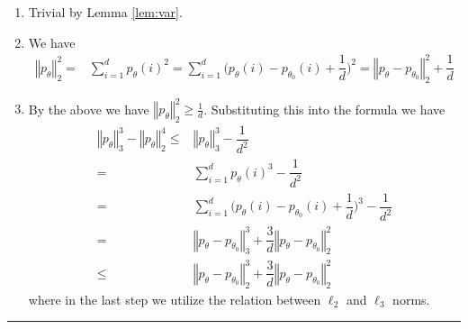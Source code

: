 \documentclass[twoside,12pt]{article}
\newenvironment{proof}{{\bf Proof:}}{\hfill\rule{2mm}{2mm}}
\begin{document}
\begin{proof}
\begin{enumerate}
   \item Trivial by Lemma \ref{lem:var}.
   \item We have
   \begin{align*}
      \left\Vert p_\theta  \right\Vert _2^2 = & \sum_{i=1}^d p_\theta (i)^2= \sum_{i=1}^d \big( p_\theta (i) -p_{\theta _0}(i) + \dfrac{ 1 }{ d } \big)^2= \left\Vert p_\theta -p_{\theta _0} \right\Vert _2^2 +\dfrac{ 1 }{ d }
   \end{align*}
   
   \item By the above we have $ \left\Vert p_\theta  \right\Vert _2^2 \geq \frac{1}{d} $. Substituting this into the formula we have
   \begin{align*}
      \left\Vert p_\theta  \right\Vert _3^3 - \left\Vert p_\theta \right\Vert _2^4 \leq & \left\Vert p_\theta  \right\Vert _3^3 - \dfrac{ 1 }{ d^2 }\\
      =&\sum_{i=1}^d p_\theta (i)^3 - \dfrac{ 1 }{ d^2 }\\
      =&\sum_{i=1}^d \big( p_\theta (i) -p_{\theta _0}(i) + \dfrac{ 1 }{ d } \big)^3 - \dfrac{ 1 }{ d^2 }\\
      =&\left\Vert p_\theta -p_{\theta _0} \right\Vert _3^3 + \dfrac{ 3 }{ d }\left\Vert p_\theta -p_{\theta _0} \right\Vert _2^2 \\
      \leq&    \left\Vert p_\theta -p_{\theta _0} \right\Vert _2^3 + \dfrac{ 3 }{ d }\left\Vert p_\theta -p_{\theta _0} \right\Vert _2^2   \tag{2}
   \end{align*}
   where in the last step we utilize the relation between $ \ell_2 $ and $ \ell_3 $ norms.
\end{enumerate}

   
   
   
      
\end{proof}
\end{document}

